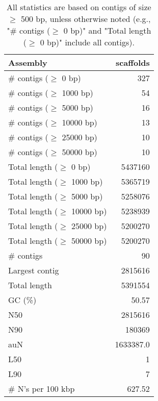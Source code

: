 \documentclass[12pt,a4paper]{article}
\begin{document}
\begin{table}[ht]
\begin{center}
\caption{All statistics are based on contigs of size $\geq$ 500 bp, unless otherwise noted (e.g., "\# contigs ($\geq$ 0 bp)" and "Total length ($\geq$ 0 bp)" include all contigs).}
\begin{tabular}{|l*{1}{|r}|}
\hline
Assembly & scaffolds \\ \hline
\# contigs ($\geq$ 0 bp) & 327 \\ \hline
\# contigs ($\geq$ 1000 bp) & 54 \\ \hline
\# contigs ($\geq$ 5000 bp) & 16 \\ \hline
\# contigs ($\geq$ 10000 bp) & 13 \\ \hline
\# contigs ($\geq$ 25000 bp) & 10 \\ \hline
\# contigs ($\geq$ 50000 bp) & 10 \\ \hline
Total length ($\geq$ 0 bp) & 5437160 \\ \hline
Total length ($\geq$ 1000 bp) & 5365719 \\ \hline
Total length ($\geq$ 5000 bp) & 5258076 \\ \hline
Total length ($\geq$ 10000 bp) & 5238939 \\ \hline
Total length ($\geq$ 25000 bp) & 5200270 \\ \hline
Total length ($\geq$ 50000 bp) & 5200270 \\ \hline
\# contigs & 90 \\ \hline
Largest contig & 2815616 \\ \hline
Total length & 5391554 \\ \hline
GC (\%) & 50.57 \\ \hline
N50 & 2815616 \\ \hline
N90 & 180369 \\ \hline
auN & 1633387.0 \\ \hline
L50 & 1 \\ \hline
L90 & 7 \\ \hline
\# N's per 100 kbp & 627.52 \\ \hline
\end{tabular}
\end{center}
\end{table}
\end{document}

